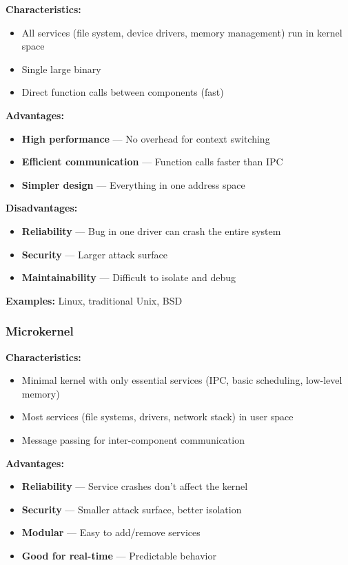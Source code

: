 \textbf{Characteristics:}
\begin{itemize}
    \item All services (file system, device drivers, memory management) run in kernel space
    \item Single large binary
    \item Direct function calls between components (fast)
\end{itemize}

\textbf{Advantages:}
\begin{itemize}
    \item \textbf{High performance} --- No overhead for context switching
    \item \textbf{Efficient communication} --- Function calls faster than IPC
    \item \textbf{Simpler design} --- Everything in one address space
\end{itemize}

\textbf{Disadvantages:}
\begin{itemize}
    \item \textbf{Reliability} --- Bug in one driver can crash the entire system
    \item \textbf{Security} --- Larger attack surface
    \item \textbf{Maintainability} --- Difficult to isolate and debug
\end{itemize}

\textbf{Examples:} Linux, traditional Unix, BSD

\subsubsection{Microkernel}

\textbf{Characteristics:}
\begin{itemize}
    \item Minimal kernel with only essential services (IPC, basic scheduling, low-level memory)
    \item Most services (file systems, drivers, network stack) in user space
    \item Message passing for inter-component communication
\end{itemize}

\textbf{Advantages:}
\begin{itemize}
    \item \textbf{Reliability} --- Service crashes don't affect the kernel
    \item \textbf{Security} --- Smaller attack surface, better isolation
    \item \textbf{Modular} --- Easy to add/remove services
    \item \textbf{Good for real-time} --- Predictable behavior
\end{itemize}

